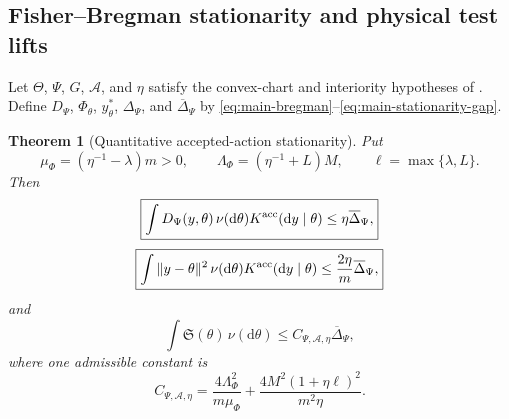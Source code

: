 \documentclass[11pt]{article}
\newtheorem{theorem}{Theorem}[section]
\theoremstyle{definition}
\theoremstyle{remark}
\newcommand{\dd}{\mathrm d}
\begin{document}
\subsection{Fisher--Bregman stationarity and physical test lifts}

Let $\Theta$, $\Psi$, $G$, $\mathcal A$, and $\eta$ satisfy the convex-chart
and interiority hypotheses of .  Define
$D_\Psi$, $\Phi_\theta$, $y_\theta^*$, $\Delta_\Psi$, and
$\overline\Delta_\Psi$ by
\eqref{eq:main-bregman}--\eqref{eq:main-stationarity-gap}.

\begin{theorem}[Quantitative accepted-action stationarity]
\label{thm:supp-action-stationarity}
Put
\begin{equation}
 \mu_\Phi=(\eta^{-1}-\lambda)m>0,\qquad
 \Lambda_\Phi=(\eta^{-1}+L)M,\qquad
 \ell=\max\{\lambda,L\}.
 \label{eq:supp-action-constants}
\end{equation}
Then
\begin{equation}
 \boxed{\int D_\Psi(y,\theta)\,
       \nu(\dd\theta)K^{\rm acc}(\dd y\mid\theta)
       \le\eta\overline\Delta_\Psi,}
 \label{eq:supp-bregman-bound}
\end{equation}
\begin{equation}
 \boxed{\int\|y-\theta\|^2\,
       \nu(\dd\theta)K^{\rm acc}(\dd y\mid\theta)
       \le\frac{2\eta}{m}\overline\Delta_\Psi,}
 \label{eq:supp-displacement-bound}
\end{equation}
and
\begin{equation}
 \boxed{\int\mathfrak S(\theta)\,\nu(\dd\theta)
       \le C_{\Psi,\mathcal A,\eta}\overline\Delta_\Psi,}
 \label{eq:supp-stationarity-bound}
\end{equation}
where one admissible constant is
\begin{equation}
 C_{\Psi,\mathcal A,\eta}
 =\frac{4\Lambda_\Phi^2}{m\mu_\Phi}
   +\frac{4M^2(1+\eta\ell)^2}{m^2\eta}.
 \label{eq:supp-stationarity-constant}
\end{equation}
\end{theorem}
\end{document}
